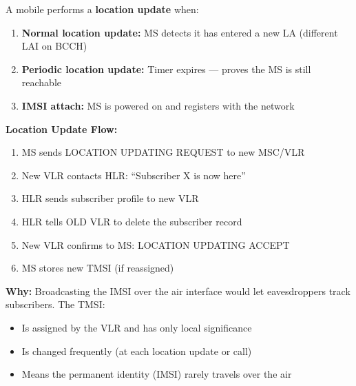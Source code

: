 
A mobile performs a \textbf{location update} when:

\begin{enumerate}
\def\labelenumi{\arabic{enumi}.}
\tightlist
\item
  \textbf{Normal location update:} MS detects it has entered a new LA (different LAI on BCCH)
\item
  \textbf{Periodic location update:} Timer expires — proves the MS is still reachable
\item
  \textbf{IMSI attach:} MS is powered on and registers with the network
\end{enumerate}

\textbf{Location Update Flow:}

\begin{enumerate}
\def\labelenumi{\arabic{enumi}.}
\tightlist
\item
  MS sends LOCATION UPDATING REQUEST to new MSC/\allowbreak{}VLR
\item
  New VLR contacts HLR: ``Subscriber X is now here''
\item
  HLR sends subscriber profile to new VLR
\item
  HLR tells OLD VLR to delete the subscriber record
\item
  New VLR confirms to MS: LOCATION UPDATING ACCEPT
\item
  MS stores new TMSI (if reassigned)
\end{enumerate}


\textbf{Why:} Broadcasting the IMSI over the air interface would let eavesdroppers track subscribers. The TMSI:

\begin{itemize}
\tightlist
\item
  Is assigned by the VLR and has only local significance
\item
  Is changed frequently (at each location update or call)
\item
  Means the permanent identity (IMSI) rarely travels over the air
\end{itemize}



\CNchained{}

